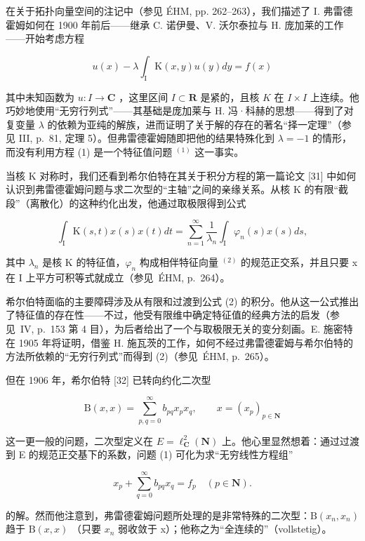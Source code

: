 
在关于拓扑向量空间的注记中（参见 ÉHM, pp. 262–263），我们描述了 I. 弗雷德霍姆如何在 1900 年前后——继承 C. 诺伊曼、V. 沃尔泰拉与 H. 庞加莱的工作——开始考虑方程

\[
u (x) - \lambda \int_ {\mathrm{I}} \mathrm{K} (x, y) u (y) d y = f (x)\tag{1}
\]

其中未知函数为 \(u\colon I\to\mathbf{C}\) ，这里区间 \(I\subset\mathbf{R}\) 是紧的，且核 \(K\) 在 \(I\times I\) 上连续。他巧妙地使用“无穷行列式”——其基础是庞加莱与 H. 冯·科赫的思想——得到了对复变量 \(\lambda\) 的依赖为亚纯的解族，进而证明了关于解的存在的著名“择一定理”（参见 III, p.~81, 定理 5）。但弗雷德霍姆随即把他的结果特殊化到 \(\lambda = -1\) 的情形，而没有利用方程 (1) 是一个特征值问题 \(^{(1)}\) 这一事实。

当核 K 对称时，我们还看到希尔伯特在其关于积分方程的第一篇论文 [31] 中如何认识到弗雷德霍姆问题与求二次型的“主轴”之间的亲缘关系。从核 K 的有限“截段”（离散化）的这种约化出发，他通过取极限得到公式

\[
\int_ {\mathrm{I}} \mathrm{K} (s, t) x (s) x (t) d t = \sum_ {n = 1} ^ {\infty} \frac {1}{\lambda_ {n}} \int_ {\mathrm{I}} \varphi_ {n} (s) x (s) d s,\tag{2}
\]

其中 \(\lambda_{n}\) 是核 K 的特征值，\(\varphi_{n}\) 构成相伴特征向量 \(^{(2)}\) 的规范正交系，并且只要 x 在 I 上平方可积等式就成立（参见~ÉHM, p.~264）。

希尔伯特面临的主要障碍涉及从有限和过渡到公式 (2) 的积分。他从这一公式推出了特征值的存在性——不过，他受有限维中确定特征值的经典方法的启发（参见~IV, p.~153 第 4 目），为后者给出了一个与取极限无关的变分刻画。E. 施密特在 1905 年将证明，借鉴 H. 施瓦茨的工作，如何不经过弗雷德霍姆与希尔伯特的方法所依赖的“无穷行列式”而得到 (2)（参见~ÉHM, p.~265）。

但在 1906 年，希尔伯特 [32] 已转向约化二次型

\[
\mathrm{B} (x, x) = \sum_ {p, q = 0} ^ {\infty} b _ {p q} x _ {p} x _ {q}, \qquad x = (x _ {p}) _ {p \in \mathbf {N}}
\]

这一更一般的问题，二次型定义在 \(E = \ell_{\mathbf{C}}^{2}(\mathbf{N})\) 上。他心里显然想着：通过过渡到 E 的规范正交基下的系数，问题 (1) 可化为求“无穷线性方程组”

\[
x _ {p} + \sum_ {q = 0} ^ {\infty} b _ {p q} x _ {q} = f _ {p} \quad (p \in \mathbf {N}).
\]

的解。然而他注意到，弗雷德霍姆问题所处理的是非常特殊的二次型：\(\mathrm{B}(x_{n}, x_{n})\) 趋于 \(\mathrm{B}(x, x)\) （只要 \(x_{n}\) 弱收敛于 x）；他称之为“全连续的”（vollstetig）。

